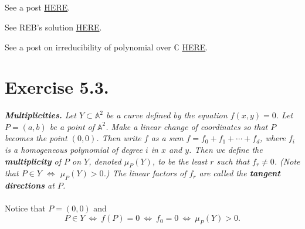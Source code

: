 \subsection{}

See a post \href{https://math.stackexchange.com/questions/1728013/is-the-affine-curve-y2-x4y4-in-mathbb-a2-singular}{HERE}.

See REB's solution \href{https://math.berkeley.edu/~reb/courses/256A/1.5.pdf}{HERE}.

See a post on irreducibility of polynomial over $\mathbb C$ \href{https://math.stackexchange.com/questions/1335827/showing-a-polynomial-is-irreducible-over-mathbbcx-y}{HERE}.

\section{Exercise 5.3.}

\textit{\textbf{Multiplicities.} Let $Y\subset \mathbb A^2$ be a curve defined by the equation $f(x,y)=0$. Let $P=(a,b)$ be a point of $\mathbb A^2$. Make a linear change of coordinates so that $P$ becomes the point $(0,0)$. Then write $f$ as a sum $f=f_0+f_1+\cdots+f_d$, where $f_i$ is a homogeneous polynomial of degree $i$ in $x$ and $y$. Then we define the \textbf{multiplicity} of $P$ on $Y$, denoted $\mu_P(Y)$, to be the least $r$ such that $f_r\neq 0$. (Note that $P\in Y$ $\Leftrightarrow$ $\mu_P(Y)>0$.) The linear factors of $f_r$ are called the \textbf{tangent directions} at $P$.}\\\\

Notice that $P=(0,0)$ and 
\[P\in Y ~\Leftrightarrow~ f(P)=0 ~\Leftrightarrow~ f_0=0 ~\Leftrightarrow~ \mu_P(Y)>0.\]

